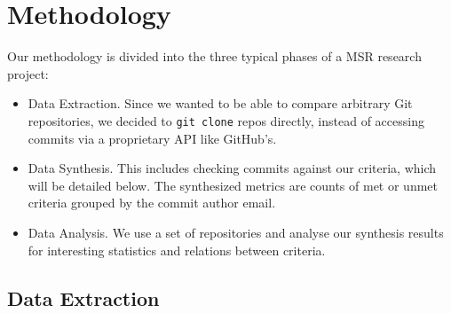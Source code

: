 \section{Methodology}

Our methodology is divided into the three typical phases of a MSR research project:


\begin{itemize}
  \item Data Extraction. Since we wanted to be able to compare arbitrary Git repositories, we decided to \texttt{git clone} repos directly, instead of accessing commits via a proprietary API like GitHub's.
  \item Data Synthesis. This includes checking commits against our criteria, which will be detailed below. The synthesized metrics are counts of met or unmet criteria grouped by the commit author email.
  \item Data Analysis. We use a set of repositories and analyse our synthesis results for interesting statistics and relations between criteria.
\end{itemize}


\subsection{Data Extraction}

%
%

